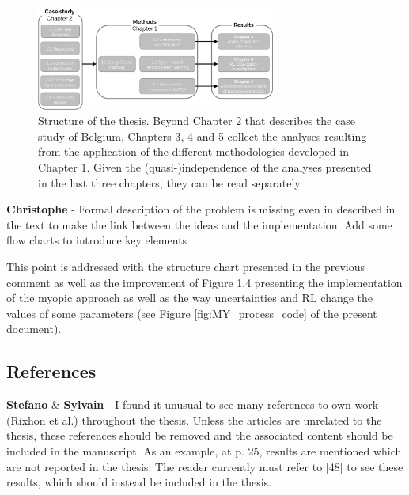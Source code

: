 \documentclass[12pt,a4paper]{article}
\begin{document}
\begin{figure}[htbp!]
\centering
\includegraphics[width=0.7\textwidth]{Thesis_Structure.pdf}
\caption{Structure of the thesis. Beyond Chapter 2 that describes the case study of Belgium, Chapters 3, 4 and 5 collect the analyses resulting from the application of the different methodologies developed in Chapter 1. Given the (quasi-)independence of the analyses presented in the last three chapters, they can be read separately.}
\label{fig:intro:Thesis_Structure}
\end{figure}


\begin{mdframed}[style=comment] %
{\color{violet} \textbf{Christophe}} - Formal description of the problem is missing even in described in the text to make the link between the ideas and the implementation. Add some flow charts to introduce key elements
\end{mdframed}

\noindent This point is addressed with the structure chart presented in the previous comment as well as the improvement of Figure 1.4 presenting the implementation of the myopic approach as well as the way uncertainties and RL change the values of some parameters (see Figure \ref{fig:MY_process_code} of the present document).

\subsection{References}
\label{references}

\begin{mdframed}[style=comment] %
{\color{orange} \textbf{Stefano}} \& {\color{purple} \textbf{Sylvain}} - I found it unusual to see many references to own work (Rixhon et al.) throughout the thesis. Unless the articles are unrelated to the thesis, these references should be removed and the associated content should be included in the manuscript. As an example, at p. 25, results are mentioned which are not reported in the thesis. The reader currently must refer to [48] to see these results, which should instead be included in the thesis. 
\end{mdframed}
\end{document}
